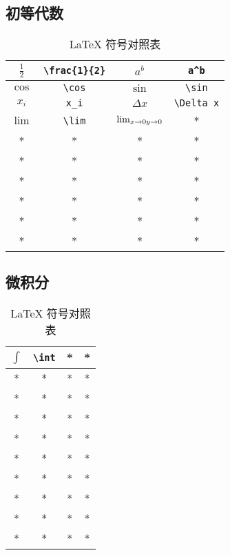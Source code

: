 
\subsection{初等代数}
\begin{table}[ht]
\centering
\caption{LaTeX 符号对照表}\label{tab_TeXSym0}
\begin{tabular}{|c|c|c|c|}
\hline
$\frac{1}{2}$ & \verb|\frac{1}{2}| & $a^b$ & \verb|a^b| \\
\hline
$\cos$ & \verb|\cos| & $\sin$ & \verb|\sin| \\
\hline
$x_i$ & \verb|x_i| & $\Delta x$& \verb|\Delta x| \\
\hline
$\lim$ & \verb|\lim| & $\lim_{ x \to 0 \\ y \to 0}$ & * \\
\hline
* & * & * & * \\
\hline
* & * & * & * \\
\hline
* & * & * & * \\
\hline
* & * & * & * \\
\hline
* & * & * & * \\
\hline
* & * & * & * \\
\hline
\end{tabular}
\end{table}


\subsection{微积分}
\begin{table}[ht]
\centering
\caption{LaTeX 符号对照表}\label{tab_TeXSym1}
\begin{tabular}{|c|c|c|c|}
\hline
$\int$ & \verb|\int| & * & * \\
\hline
* & * & * & * \\
\hline
* & * & * & * \\
\hline
* & * & * & * \\
\hline
* & * & * & * \\
\hline
* & * & * & * \\
\hline
* & * & * & * \\
\hline
* & * & * & * \\
\hline
* & * & * & * \\
\hline
* & * & * & * \\
\hline
\end{tabular}
\end{table}
